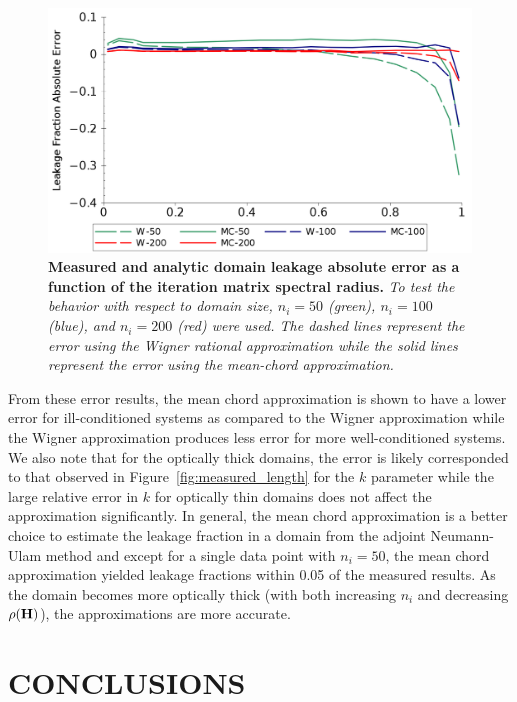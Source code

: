 \documentclass{mc2013}
\begin{document}
\begin{figure}[ht!]
  \begin{spacing}{1.0}
    \begin{center}
      \includegraphics[width=4.5in,clip]{leakage_error.png}
    \end{center}
    \caption{\textbf{Measured and analytic domain leakage absolute error
        as a function of the iteration matrix spectral radius.}
      \textit{To test the behavior with respect to domain size, $n_i=50$
        (green), $n_i=100$ (blue), and $n_i=200$ (red) were used. The
        dashed lines represent the error using the Wigner rational
        approximation while the solid lines represent the error using
        the mean-chord approximation.}}
    \label{fig:leakage_error}
  \end{spacing}
\end{figure}
From these error results, the mean chord approximation is shown to
have a lower error for ill-conditioned systems as compared to the
Wigner approximation while the Wigner approximation produces less
error for more well-conditioned systems. We also note that for the
optically thick domains, the error is likely corresponded to that
observed in Figure~\ref{fig:measured_length} for the $k$ parameter
while the large relative error in $k$ for optically thin domains does
not affect the approximation significantly. In general, the mean chord
approximation is a better choice to estimate the leakage fraction in a
domain from the adjoint Neumann-Ulam method and except for a single
data point with $n_i=50$, the mean chord approximation yielded leakage
fractions within 0.05 of the measured results. As the domain becomes
more optically thick (with both increasing $n_i$ and decreasing
$\rho(\mathbf{H})$), the approximations are more accurate.

\section{CONCLUSIONS}
\end{document}
